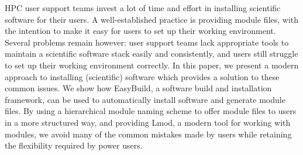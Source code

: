HPC user support teams invest a lot of time and effort in installing scientific
software for their users. A well-established practice is providing module files,
with the intention to make it easy for users to set up their working environment.
Several problems remain however: user support teams lack appropriate tools to
maintain a scientific software stack easily and consistently, and users still
struggle to set up their working environment correctly.
In this paper, we present a modern approach to installing (scientific) software which
provides a solution to these common issues. We show how EasyBuild, a software
build and installation framework, can be used to automatically install software
and generate module files.  By using a hierarchical module naming
scheme to offer module files to users in a more structured way, and providing Lmod,
a modern tool for working with modules, we avoid many of the common mistakes made
by users while retaining the flexibility required by power users. 
